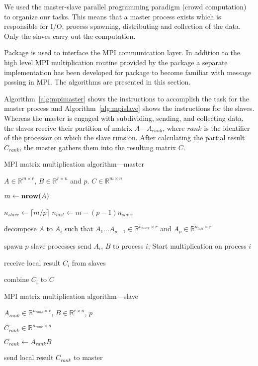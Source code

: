 We used the master-slave parallel programming paradigm (crowd
computation) to organize our tasks. This means that a master process
exists which is responsible for I/O, process spawning, distributing
and collection of the data. Only the slaves carry out the
computation.

Package  is used to interface the MPI communication
layer. In addition to the high level MPI multiplication routine 
 provided by the package  a separate implementation has
been developed for package  to become familiar with message
passing in MPI. The algorithms are presented in this section.


Algorithm~\ref{alg:mpimaster} shows the instructions to accomplish the
task for the master process and Algorithm~\ref{alg:mpislave} shows the
instructions for the slaves. Whereas the master is engaged with
subdividing, sending, and collecting data, the slaves receive their
partition of matrix $A$---$A_{rank}$, where $rank$ is the identifier of
the processor on which the slave runs on. After calculating the
partial result $C_{rank}$, the master gathers them into the resulting
matrix $C$.  

\begin{algorithm}
\caption{MPI matrix multiplication algorithm---master}
\label{alg:mpimaster}
\begin{algorithmic}[1]

  \REQUIRE $A \in \mathbb{R}^{m \times r}$, $B \in \mathbb{R}^{r
    \times n}$ and $p$.
  \ENSURE $C \in \mathbb{R}^{m \times n}$

  \STATE $m \leftarrow \textbf{nrow} (A)$
  
  \STATE $n_{slave} \leftarrow \lceil m/p \rceil$
  \STATE $n_{last} \leftarrow m - (p - 1) n_{slave} $
  
  \STATE decompose $A$ to $A_i$ such that $A_1 ... A_{p-1} \in
  \mathbb{R}^{n_{slave} \times r}$ and $A_p \in \mathbb{R}^{n_{last} \times r} $  
  
  \STATE spawn $p$ slave processes
    \STATE send $A_i$, $B$ to process $i$; Start
    multiplication on process $i$ 
  \ENDFOR
  
    \STATE receive local result $C_{i}$ from slaves
  \ENDFOR
  
  \STATE combine $C_{i}$ to $C$

\end{algorithmic}
\end{algorithm}

\begin{algorithm}
\caption{MPI matrix multiplication algorithm---slave}
\label{alg:mpislave}
\begin{algorithmic}[1]

  \REQUIRE $ A_{rank} \in \mathbb{R}^{n_{rank} \times r}$, $B
  \in \mathbb{R}^{r\times n}$, $p$

  \ENSURE $C_{rank} \in \mathbb{R}^{n_{rank} \times n}$

  \STATE $C_{rank} \leftarrow A_{rank}B$

  \STATE send local result $C_{rank}$ to master
  
\end{algorithmic}
\end{algorithm}


